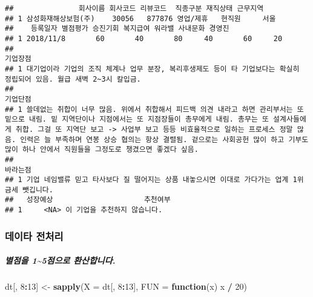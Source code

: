 \documentclass[]{article}
\newenvironment{Shaded}{\begin{snugshade}}{\end{snugshade}}
\newcommand{\KeywordTok}[1]{\textcolor[rgb]{0.13,0.29,0.53}{\textbf{#1}}}
\newcommand{\DataTypeTok}[1]{\textcolor[rgb]{0.13,0.29,0.53}{#1}}
\newcommand{\DecValTok}[1]{\textcolor[rgb]{0.00,0.00,0.81}{#1}}
\newcommand{\StringTok}[1]{\textcolor[rgb]{0.31,0.60,0.02}{#1}}
\newcommand{\ControlFlowTok}[1]{\textcolor[rgb]{0.13,0.29,0.53}{\textbf{#1}}}
\newcommand{\OperatorTok}[1]{\textcolor[rgb]{0.81,0.36,0.00}{\textbf{#1}}}
\newcommand{\NormalTok}[1]{#1}
\let\oldsubparagraph\subparagraph
\renewcommand{\subparagraph}[1]{\oldsubparagraph{#1}\mbox{}}
\begin{document}
\begin{verbatim}
##               회사이름 회사코드 리뷰코드  직종구분 재직상태 근무지역
## 1 삼성화재해상보험(주)    30056   877876 영업/제휴   현직원     서울
##    등록일자 별점평가 승진기회 복지급여 워라밸 사내문화 경영진
## 1 2018/11/8       60       40       80     40       60     20
##                                                                                                                 기업장점
## 1 대기업이라 기업의 조직 체계나 업무 분장, 복리후생제도 등이 타 기업보다는 확실히 정립되어 있음. 월급 새벽 2~3시 칼입금.
##                                                                                                                                                                                                                                                                                                                                                                                                        기업단점
## 1 쓸데없는 취합이 너무 많음. 위에서 취합해서 피드백 의견 내라고 하면 관리부서는 또 밑으로 내림. 밑 지역단이나 지점에서는 또 지점장들이 총무에게 내림. 총무는 또 설계사들에게 취합. 그걸 또 지역단 보고 -> 사업부 보고 등등 비효율적으로 일하는 프로세스 정말 많음. 인력은 늘 부족하며 연봉 상승 협의는 항상 결렬됨. 겉으로는 사회공헌 많이 하고 기부도 많이 하나 안에서 직원들을 그정도로 챙겼으면 좋겠다 싶음.
##                                                                                          바라는점
## 1 기업 네임밸류 믿고 타사보다 질 떨어지는 상품 내놓으시면 이대로 가다가는 업계 1위 금세 뺏깁니다.
##   성장예상                     추천여부
## 1     <NA> 이 기업을 추천하지 않습니다.
\end{verbatim}

\subsubsection{데이타 전처리}\label{-}

\subparagraph{별점을 1\textasciitilde{}5점으로 환산합니다.}\label{-15-.}

\begin{Shaded}
\begin{Highlighting}[]
\NormalTok{dt[, }\DecValTok{8}\OperatorTok{:}\DecValTok{13}\NormalTok{] <-}\StringTok{ }\KeywordTok{sapply}\NormalTok{(}\DataTypeTok{X =}\NormalTok{ dt[, }\DecValTok{8}\OperatorTok{:}\DecValTok{13}\NormalTok{], }\DataTypeTok{FUN =} \ControlFlowTok{function}\NormalTok{(x) x }\OperatorTok{/}\StringTok{ }\DecValTok{20}\NormalTok{)}
\end{Highlighting}
\end{Shaded}
\end{document}
